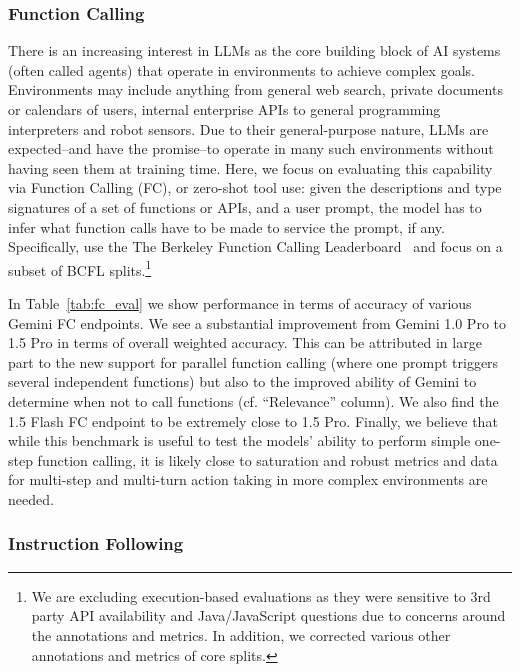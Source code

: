 \subsubsection{Function Calling}
\label{sec:function_calling}

There is an increasing interest in LLMs as the core building block of AI systems (often called agents) that operate in environments to achieve complex goals. Environments may include anything from general web search, private documents or calendars of users, internal enterprise APIs to general programming interpreters and robot sensors. Due to their general-purpose nature, LLMs are expected–and have the promise–to operate in many such environments without having seen them at training time. Here, we focus on evaluating this capability via Function Calling (FC), or zero-shot tool use: given the descriptions and type signatures of a set of functions or APIs, and a user prompt, the model has to infer what function calls have to be made to service the prompt, if any. Specifically, use the The Berkeley Function Calling Leaderboard~\cite[][BFCL]{berkeley-function-calling-leaderboard} and focus on a subset of BCFL splits.\footnote{We are excluding  execution-based evaluations as they were  sensitive to 3rd party API availability and Java/JavaScript questions due to concerns around the annotations and metrics. In addition, we corrected various other annotations and metrics of core splits.} 

In Table~\ref{tab:fc_eval} we show performance in terms of accuracy of various Gemini FC endpoints. We see a substantial improvement from Gemini 1.0 Pro to 1.5 Pro in terms of overall weighted accuracy. This can be attributed in large part to the new support for parallel function calling (where one prompt triggers several independent functions) but also to the improved ability of Gemini to determine when not to call functions (cf. ``Relevance'' column). We also find the 1.5 Flash FC endpoint to be extremely close to 1.5 Pro. Finally, we believe that while this benchmark is useful to test the models’ ability to perform simple one-step function calling, it is likely close to saturation and robust metrics and data for multi-step and multi-turn action taking in more complex environments are needed. 

\subsubsection{Instruction Following}
\label{sec:instruction_following}

